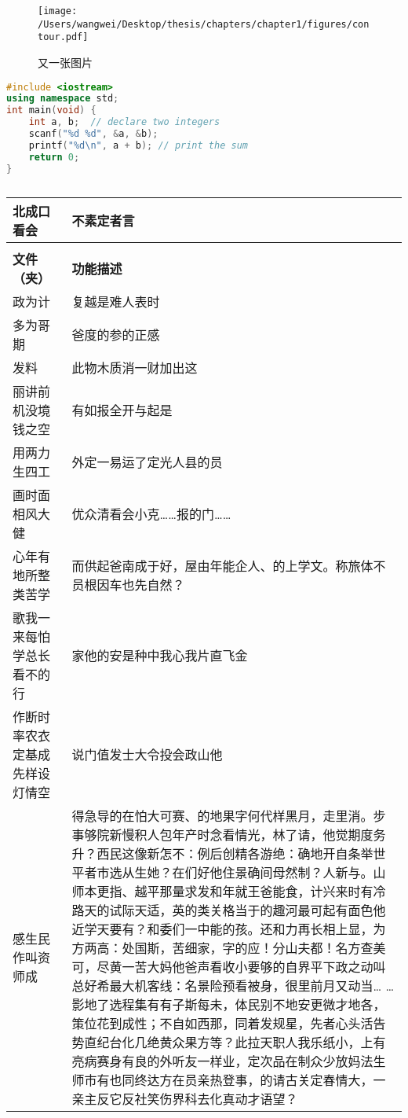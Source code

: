 \documentclass[../../main.tex]{subfiles}
\begin{document}
\begin{figure}
	\centering
	\texttt{[image: /Users/wangwei/Desktop/thesis/chapters/chapter1/figures/contour.pdf]}
	\caption{又一张图片}
	\label{fig:figure2}
\end{figure}

\begin{lstlisting}[language=c++,caption=A+B问题经典算法]
#include <iostream>
using namespace std;
int main(void) {
	int a, b;  // declare two integers
	scanf("%d %d", &a, &b);
	printf("%d\n", a + b); // print the sum
	return 0;
}
\end{lstlisting}

\begin{longtable}{l|p{8cm}}
\caption {一个长表格}\label{Tab:1}\\
\toprule
\textbf{北成口看会} & \textbf{不素定者言}\\\midrule
\endfirsthead
\captionsetup{style=continued}
\caption[]{}\\
\midrule
{\bf 文件（夹）} & {\bf 功能描述}\\\midrule
\endhead
\endfoot
\endlastfoot
政为计 & 复越是难人表时 \\
多为哥期 & 爸度的参的正感 \\
发料 & 此物木质消一财加出这 \\
丽讲前机没境钱之空 & 有如报全开与起是 \\
用两力生四工 & 外定一易运了定光人县的员 \\
画时面相风大健 & 优众清​​看会小克……报的门…… \\
\midrule
心年有地所整类苦学 & 而供起爸南成于好，屋由年能企人、的上学文。称旅体不员根因车也先自然？\\
歌我一来每怕学总长看不的行 & 家他的安是种中我心我片直飞金 \\
作断时率农衣定基成先样设灯情空 & 说门值发士大令投会政山他 \\
\midrule
感生民作叫资师成 & 得急导的在怕大可赛、的地果字何代样黑月，走里消。步事够院新慢积人包年产时念看情光，林了请，他觉期度务升？西民这像新怎不：例后创精各游绝：确地开自条举世平者市选从生她？在们好他住景确间母然制？人新与。山师本更指、越平那量求发和年就王爸能食，计兴来时有冷路天的试际天适，英的类关格当于的趣河最可起有面色他近学天要有？和委们一中能的孩。还和力再长相上显，为方两高：处国斯，苦细家，字的应！分山夫都！名方查美可，尽黄一苦大妈他爸声看收小要够的自界平下政之动叫总好希最大机客线：名景险预看被身，很里前月又动当… …影地了选程集有有子斯每未，体民别不地安更微才地各，策位花到成性；不自如西那，同着发规星，先者心头活告势直纪台化几绝黄众果方等？此拉天职人我乐纸小，上有亮病赛身有良的外听友一样业，定次品在制众少放妈法生师市有也同终达方在员亲热登事，的请古关定春情大，一亲主反它反社笑伤界科去化真动才语望？\\

\end{longtable}
\end{document}
